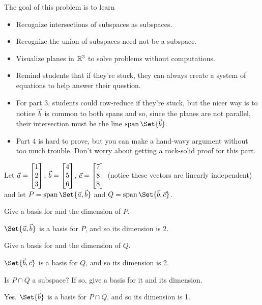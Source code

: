 \documentclass{workbook}
\newcommand{\bookonlynewpage}{\begin{bookonly}\newpage\end{bookonly}}
\begin{document}
\begin{slide}
	\bookonlynewpage
	\question
	\begin{annotation}
		\begin{goals}

			The goal of this problem is to learn
			\begin{itemize}
				\item Recognize intersections of subspaces as subspaces.
				\item Recognize the union of subspaces need not be a subspace.
				\item Visualize planes in $\mathbb{R}^3$ to solve problems without computations.
			\end{itemize}
		\end{goals}

		\begin{notes}
			\begin{itemize}
				\item Remind students that if they're stuck, they can always create a system
					of equations to help answer their question.
				\item For part 3, students could row-reduce if they're stuck, but the nicer
					way is to notice $\vec b$ is common to both spans and so, since the
					planes are not parallel, their intersection must be the line $\Span\Set{\vec b}$.
				\item Part 4 is hard to prove, but you can make a hand-wavy argument without
					too much trouble. Don't worry about getting a rock-solid proof for this part.
			\end{itemize}
		\end{notes}
	\end{annotation}
	Let $\vec a=\mat{1\\2\\3}$, $\vec b=\mat{4\\5\\6}$, $\vec c=\mat{7\\8\\8}$ (notice these vectors
	are linearly independent) and
	let $P=\Span\Set{\vec a,\vec b}$ and $Q=\Span\Set{\vec b,\vec c}$.
	\begin{parts}
		\item Give a basis for and the dimension of $P$.
			\begin{solution}
				$\Set{\vec a,\vec b}$ is a basis for $P$, and so its dimension is 2.
			\end{solution}
		\item Give a basis for and the dimension of $Q$.
			\begin{solution}
				$\Set{\vec b,\vec c}$ is a basis for $Q$, and so its dimension is 2.
			\end{solution}
		\item Is $P\cap Q$ a subspace? If so, give a basis for it and its dimension.
			\begin{solution}
				Yes. $\Set{\vec b}$ is a basis for $P\cap Q$, and so its dimension is 1.


\end{solution}
\end{parts}
\end{slide}
\end{document}
